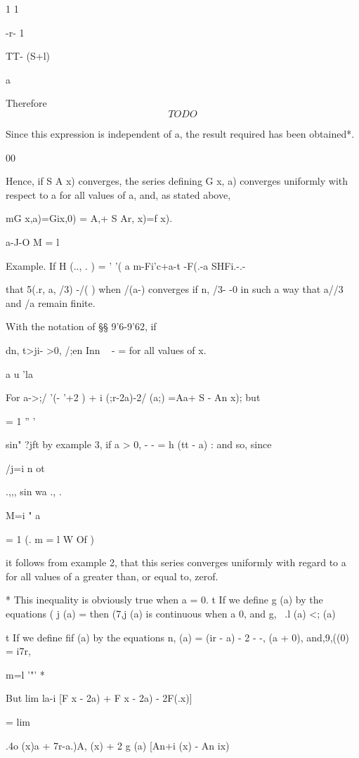 1 1

-r- 1

 TT- (S+l)

a

%
%

Therefore
$$
TODO
$$

Since this expression is independent of a, the result required has
been obtained*.

00

Hence, if S A x) converges, the series defining G x, a) converges
uniformly with respect to a for all values of a, and, as stated above,
\ \ {mG x,a)=Gix,0) = A,+ S Ar, x)=f x).

a-J-O M = l

Example. If H (.., . ) = ' '( a m-Fi'c+a-t -F(.-a SHFi.-.-

that 5(.r, a, /3) -/( ) when /(a-) converges if n, /3- -0 in such a
way that a//3 and /a remain finite. 

With the notation of §§ 9'6-9'62, if

dn, t>ji- >0, /;en Inn ~ - = for all values of x.

a u 'la

For a->;/ '(- '+2 ) + i (;r-2a)-2/ (a;) =Aa+ S - An x); but

  = 1 '' '

  sin" ?jft by example 3, if a > 0, - - = h (tt - a) : and so,
since

/j=i n ot

.,,, sin wa ., .

M=i " a

  = 1 (. m = l W Of )

it follows from example 2, that this series converges uniformly
with regard to a for all values of a greater than, or equal to, zerof.

* This inequality is obviously true when a = 0. t If we define g (a)
by the equations ( j (a) = then (7,j (a) is continuous when a 0, and
g, \ .l (a) <; (a)

t If we define fif (a) by the equations n, (a) = (ir - a) - 2 - -,
(a + 0), and,9,((0) = i7r,

m=l '"' *

%
%

But lim la-i [F x - 2a) + F x - 2a) - 2F(.x)]

= lim

.4o (x)a + 7r-a.)A, (x) + 2 g (a) [An+i (x) - An ix)

}
